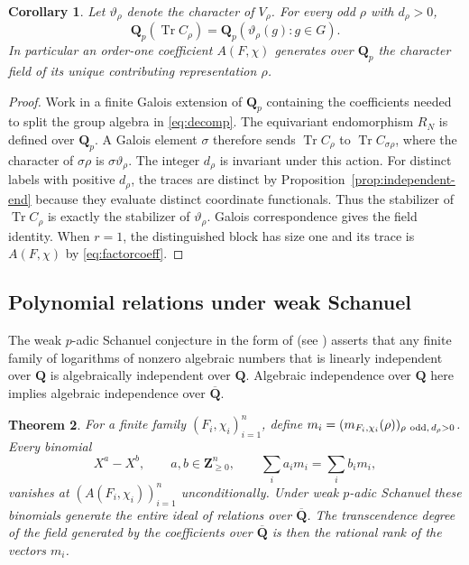\documentclass[11pt]{amsart}
\numberwithin{equation}{section}
\newtheorem{theorem}{Theorem}[section]
\newtheorem{corollary}[theorem]{Corollary}
\theoremstyle{definition}
\theoremstyle{remark}
\newcommand{\Q}{\mathbf Q}
\newcommand{\Z}{\mathbf Z}
\newcommand{\Qbar}{\overline{\mathbf Q}}
\newcommand{\Tr}{\operatorname{Tr}}
\begin{document}
\begin{corollary}\label{cor:coefficientfield}
Let $\vartheta_\rho$ denote the character of $V_\rho$.
For every odd $\rho$ with $d_\rho>0$,
\[
 \Q_p(\Tr C_\rho)=\Q_p(\vartheta_\rho(g):g\in G).
\]
In particular an order-one coefficient $A(F,\chi)$
generates over $\Q_p$ the character field of its
unique contributing representation $\rho$.
\end{corollary}

\begin{proof}
Work in a finite Galois extension of $\Q_p$ containing
the coefficients needed to split the group algebra in
\eqref{eq:decomp}. The equivariant endomorphism $R_N$ is
defined over $\Q_p$. A Galois element $\sigma$ therefore
sends $\Tr C_\rho$ to $\Tr C_{\sigma\rho}$, where the
character of $\sigma\rho$ is $\sigma\vartheta_\rho$.
The integer $d_\rho$ is invariant under this action.
For distinct labels with positive $d_\rho$, the traces
are distinct by Proposition~\ref{prop:independent-end}
because they evaluate distinct coordinate functionals.
Thus the stabilizer of $\Tr C_\rho$ is exactly the
stabilizer of $\vartheta_\rho$. Galois correspondence
gives the field identity. When $r=1$, the distinguished
block has size one and its trace is $A(F,\chi)$ by
\eqref{eq:factorcoeff}.
\end{proof}

\subsection{Polynomial relations under weak Schanuel}

The weak $p$-adic Schanuel conjecture in the form of
\cite[Conj.~3.10]{CM} (see \cite[\S2]{Maksoud}) asserts that any finite
family of logarithms of nonzero algebraic numbers that is
linearly independent over $\Q$ is algebraically independent
over $\Q$. Algebraic independence over $\Q$ here implies
algebraic independence over $\Qbar$.

\begin{theorem}\label{thm:ideal}
For a finite family $(F_i,\chi_i)_{i=1}^n$, define
$m_i=(m_{F_i,\chi_i}(\rho))_{\rho\ {\rm odd},\,d_\rho>0}$.
Every binomial
\begin{equation}\label{eq:binomial}
 X^a-X^b,\qquad
 a,b\in\Z_{\ge0}^n,\qquad \sum_i a_i m_i=\sum_i b_i m_i ,
\end{equation}
vanishes at $(A(F_i,\chi_i))_{i=1}^n$ unconditionally.
Under weak $p$-adic Schanuel these binomials generate the
entire ideal of relations over $\Qbar$. The transcendence
degree of the field generated by the coefficients over
$\Qbar$ is then the rational rank of the vectors $m_i$.
\end{theorem}
\end{document}

